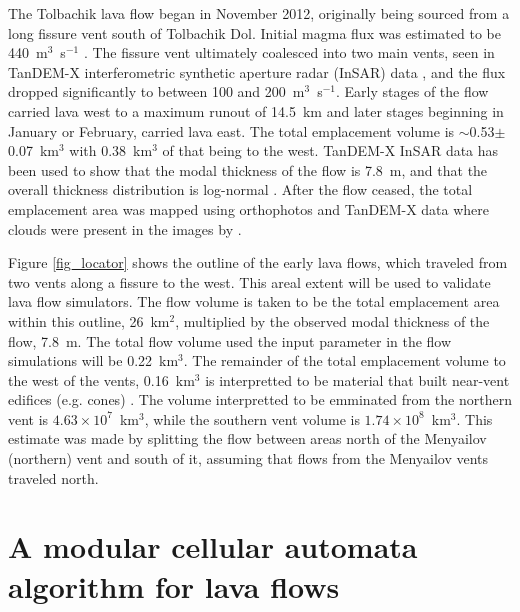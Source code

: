 The Tolbachik lava flow began in November 2012, originally being sourced from a long fissure vent south of Tolbachik Dol. Initial magma flux was estimated to be 440~m$^3$~s$^{-1}$ \citep{belousov2015overview}. The fissure vent ultimately coalesced into two main vents, seen in TanDEM-X interferometric synthetic aperture radar (InSAR) data \citep{kubanek2015lava}, and the flux dropped significantly to between 100 and 200~m$^3$~s$^{-1}$. Early stages of the flow carried lava west to a maximum runout of 14.5~km and later stages beginning in January or February, carried lava east. The total emplacement volume is $\sim$0.53$\pm$0.07~km$^3$ with 0.38~km$^3$ of that being to the west. TanDEM-X InSAR data has been used to show that the modal thickness of the flow is 7.8~m, and that the overall thickness distribution is log-normal \citep{kubanek2015lava}. After the flow ceased, the total emplacement area was mapped using orthophotos and TanDEM-X data where clouds were present in the images by \citet{kubanek2015lava}.

Figure \ref{fig_locator} shows the outline of the early lava flows, which traveled from two vents along a fissure to the west. This areal extent will be used to validate lava flow simulators. The flow volume is taken to be the total emplacement area within this outline, 26~km$^2$, multiplied by the observed modal thickness of the flow, 7.8~m. The total flow volume used the input parameter in the flow simulations will be 0.22~km$^3$. The remainder of the total emplacement volume to the west of the vents, 0.16~km$^3$ is interpretted to be material that built near-vent edifices (e.g. cones) \citep{kubanek2015lava}. The volume interpretted to be emminated from the northern vent is $4.63\times 10^7$~km$^3$, while the southern vent volume is $1.74\times 10^8$~km$^3$. This estimate was made by splitting the flow between areas north of the Menyailov (northern) vent and south of it, assuming that flows from the Menyailov vents traveled north.
	


\section{A modular cellular automata algorithm for lava flows}\label{sec:MOLASSES}

